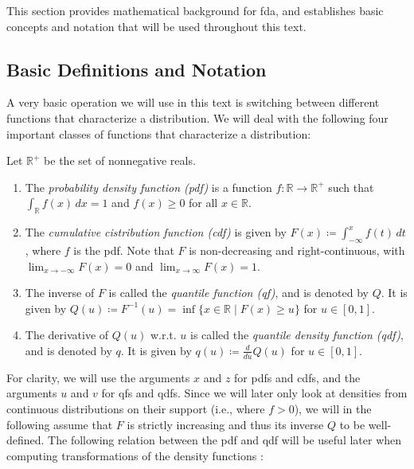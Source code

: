 This section provides mathematical background for fda, and establishes basic concepts
and notation that will be used throughout this text.

\subsection{Basic Definitions and Notation}
\label{sec:basics}
A very basic operation we will use in this text is switching between different functions
that characterize a distribution. We will deal with the following four important classes
of functions that characterize a distribution:

\begin{definition}
    Let \(\mathbb{R}^+\) be the set of nonnegative reals.
    \begin{enumerate}
        \item The \textit{probability density function (pdf)} is a function
        \( f: \mathbb{R} \to \mathbb{R}^+ \) such that \( \int_{\mathbb{R}} f(x) \, dx = 1 \)
        and \( f(x) \geq 0 \) for all \( x \in \mathbb{R} \).

        \item The \textit{cumulative cistribution function (cdf)} is given by
        \( F(x) \coloneqq \int_{-\infty}^{x} f(t) \, dt \), where \( f \) is the pdf.
        Note that \( F\) is non-decreasing and right-continuous,
        with \( \lim_{{x \to -\infty}} F(x) = 0 \) and \( \lim_{{x \to \infty}} F(x) = 1 \).

        \item The inverse of \(F\) is called the \textit{quantile function (qf)},
        and is denoted by \(Q\). It is given by \( Q(u) \coloneqq F^{-1}(u) =
        \inf \{ x \in \mathbb{R} \mid F(x) \geq u \} \) for \( u \in [0, 1] \).

        \item The derivative of \(Q(u)\) w.r.t. \(u\) is called the \textit{quantile
        density function (qdf)}, and is denoted by \(q\). It is given by
        \(q(u) \coloneqq \frac{d}{du} Q(u)\) for \( u \in [0, 1] \).
    \end{enumerate}
\end{definition}

For clarity, we will use the arguments $x$ and $z$ for pdfs and cdfs, and the arguments
$u$ and $v$ for qfs and qdfs. Since we will later only look at densities from continuous
distributions on their support (i.e., where $f > 0$), we will in the following assume
that $F$ is strictly increasing and thus its inverse $Q$ to be well-defined.
The following relation between the pdf and qdf will be useful later when computing
transformations of the density functions \parencite[cf.][]{Jones1992}:

